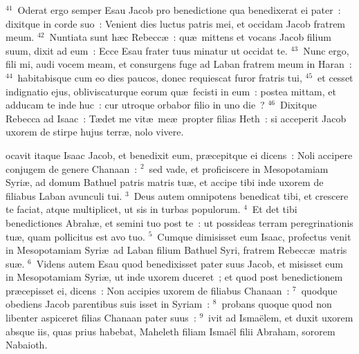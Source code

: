 ${}^{41}$~Oderat ergo semper Esau Jacob pro benedictione qua benedixerat ei pater~: dixitque in corde suo~: Venient dies luctus patris mei, et occidam Jacob fratrem meum.
${}^{42}$~Nuntiata sunt h\ae c Rebecc\ae~: qu\ae\ mittens et vocans Jacob filium suum, dixit ad eum~: Ecce Esau frater tuus minatur ut occidat te.
${}^{43}$~Nunc ergo, fili mi, audi vocem meam, et consurgens fuge ad Laban fratrem meum in Haran~:
${}^{44}$~habitabisque cum eo dies paucos, donec requiescat furor fratris tui,
${}^{45}$~et cesset indignatio ejus, obliviscaturque eorum qu\ae\ fecisti in eum~: postea mittam, et adducam te inde huc~: cur utroque orbabor filio in uno die~?
${}^{46}$~Dixitque Rebecca ad Isaac~: T\ae det me vit\ae\ me\ae\ propter filias Heth~: si acceperit Jacob uxorem de stirpe hujus terr\ae , nolo vivere.

\bchapter
{}ocavit itaque Isaac Jacob, et benedixit eum, pr\ae cepitque ei dicens~: Noli accipere conjugem de genere Chanaan~:
${}^{2}$~sed vade, et proficiscere in Mesopotamiam Syri\ae , ad domum Bathuel patris matris tu\ae , et accipe tibi inde uxorem de filiabus Laban avunculi tui.
${}^{3}$~Deus autem omnipotens benedicat tibi, et crescere te faciat, atque multiplicet, ut sis in turbas populorum.
${}^{4}$~Et det tibi benedictiones Abrah\ae , et semini tuo post te~: ut possideas terram peregrinationis tu\ae , quam pollicitus est avo tuo.
${}^{5}$~Cumque dimisisset eum Isaac, profectus venit in Mesopotamiam Syri\ae\ ad Laban filium Bathuel Syri, fratrem Rebecc\ae\ matris su\ae .
${}^{6}$~Videns autem Esau quod benedixisset pater suus Jacob, et misisset eum in Mesopotamiam Syri\ae , ut inde uxorem duceret~; et quod post benedictionem pr\ae cepisset ei, dicens~: Non accipies uxorem de filiabus Chanaan~:
${}^{7}$~quodque obediens Jacob parentibus suis isset in Syriam~:
${}^{8}$~probans quoque quod non libenter aspiceret filias Chanaan pater suus~:
${}^{9}$~ivit ad Isma\"elem, et duxit uxorem absque iis, quas prius habebat, Maheleth filiam Isma\"el filii Abraham, sororem Nabaioth.


